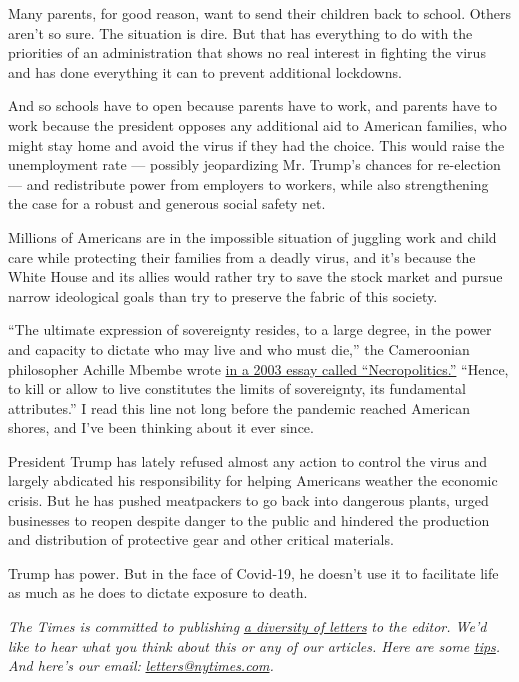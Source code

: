 Many parents, for good reason, want to send their children back to
school. Others aren't so sure. The situation is dire. But that has
everything to do with the priorities of an administration that shows no
real interest in fighting the virus and has done everything it can to
prevent additional lockdowns.

And so schools have to open because parents have to work, and parents
have to work because the president opposes any additional aid to
American families, who might stay home and avoid the virus if they had
the choice. This would raise the unemployment rate --- possibly
jeopardizing Mr. Trump's chances for re-election --- and redistribute
power from employers to workers, while also strengthening the case for a
robust and generous social safety net.

Millions of Americans are in the impossible situation of juggling work
and child care while protecting their families from a deadly virus, and
it's because the White House and its allies would rather try to save the
stock market and pursue narrow ideological goals than try to preserve
the fabric of this society.

``The ultimate expression of sovereignty resides, to a large degree, in
the power and capacity to dictate who may live and who must die,'' the
Cameroonian philosopher Achille Mbembe wrote
\href{https://warwick.ac.uk/fac/arts/english/currentstudents/postgraduate/masters/modules/postcol_theory/mbembe_22necropolitics22.pdf}{in
a 2003 essay called ``Necropolitics.''} ``Hence, to kill or allow to
live constitutes the limits of sovereignty, its fundamental
attributes.'' I read this line not long before the pandemic reached
American shores, and I've been thinking about it ever since.

President Trump has lately refused almost any action to control the
virus and largely abdicated his responsibility for helping Americans
weather the economic crisis. But he has pushed meatpackers to go back
into dangerous plants, urged businesses to reopen despite danger to the
public and hindered the production and distribution of protective gear
and other critical materials.

Trump has power. But in the face of Covid-19, he doesn't use it to
facilitate life as much as he does to dictate exposure to death.

\emph{The Times is committed to publishing}
\href{https://www.nytimes.com/2019/01/31/opinion/letters/letters-to-editor-new-york-times-women.html}{\emph{a
diversity of letters}} \emph{to the editor. We'd like to hear what you
think about this or any of our articles. Here are some}
\href{https://help.nytimes.com/hc/en-us/articles/115014925288-How-to-submit-a-letter-to-the-editor}{\emph{tips}}\emph{.
And here's our email:}
\href{mailto:letters@nytimes.com}{\emph{letters@nytimes.com}}\emph{.}

